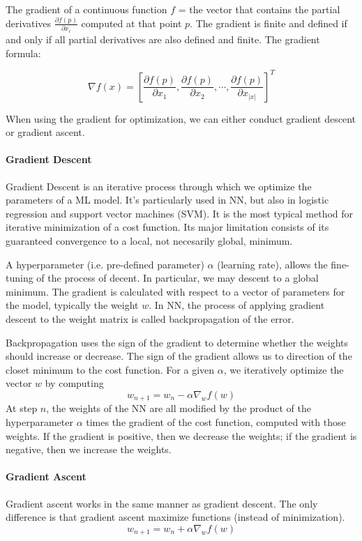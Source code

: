 \documentclass[lang=en,mode=geye,device=normal,color=blue,14pt]{elegantnote}
\DeclareMathOperator*{\1}{\mathbbm{1}}
\begin{document}
The gradient of a continuous function $f$ = the vector that contains the partial derivatives $\frac{\partial f(p)}{\partial x_i}$ computed at that point $p$.
The gradient is finite and defined if and only if all partial derivatives are also defined and finite.
The gradient formula:

$$ \nabla f(x) = [\frac{\partial f(p)}{\partial x_1}, \frac{\partial f(p)}{\partial x_2}, \cdots, \frac{\partial f(p)}{\partial x_{|x|}}]^T $$

When using the gradient for optimization, we can either conduct gradient descent or gradient ascent.

\paragraph{Gradient Descent}
Gradient Descent is an iterative process through which we optimize the parameters of a ML model. It's particularly used in NN, but also in logistic regression and support vector machines (SVM). It is the most typical method for iterative minimization of a cost function. Its major limitation consists of its guaranteed convergence to a local, not necesarily global, minimum.

A hyperparameter (i.e. pre-defined parameter) $\alpha$ (learning rate), allows the fine-tuning of the process of decent. In particular, we may descent to a global minimum.
The gradient is calculated with respect to a vector of parameters for the model, typically the weight $w$. In NN, the process of applying gradient descent to the weight matrix is called backpropagation of the error.

Backpropagation uses the sign of the gradient to determine whether the weights should increase or decrease. The sign of the gradient allows us to direction of the closet minimum to the cost function. For a given $\alpha$, we iteratively optimize the vector $w$ by computing
$$ w_{n+1} = w_n - \alpha \nabla_w f(w) $$
At step $n$, the weights of the NN are all modified by the product of the hyperparameter $\alpha$ times the gradient of the cost function, computed with those weights.
If the gradient is positive, then we decrease the weights; if the gradient is negative, then we increase the weights.

\paragraph{Gradient Ascent}
Gradient ascent works in the same manner as gradient descent. The only difference is that gradient ascent maximize functions (instead of minimization).
$$ w_{n+1} = w_n + \alpha \nabla_w f(w) $$
\end{document}
